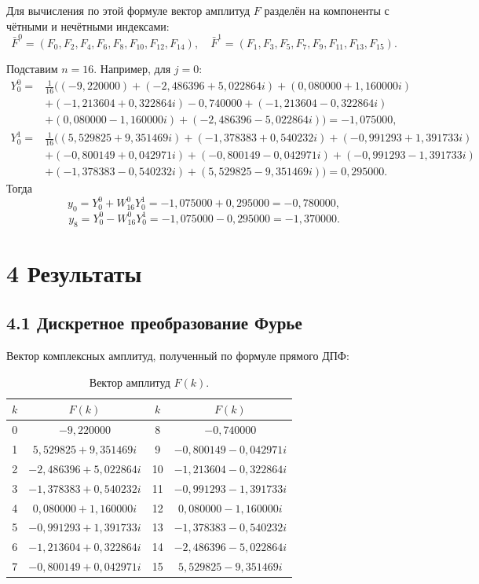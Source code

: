 \documentclass[14pt,a4paper]{extarticle}
\begin{document}
Для вычисления по этой формуле вектор амплитуд $F$ разделён на компоненты с чётными и нечётными индексами:
\begingroup\scriptsize
\[
\bar F^0=(F_0,F_2,F_4,F_6,F_8,F_{10},F_{12},F_{14}),
\quad
\bar F^1=(F_1,F_3,F_5,F_7,F_9,F_{11},F_{13},F_{15}).
\]
\endgroup

Подставим $n=16$. Например, для $j=0$:
\begingroup\scriptsize
\begin{align*}
Y^0_0={}&\frac{1}{16}\bigl((-9{,}220000)+(-2{,}486396+5{,}022864i)
+(0{,}080000+1{,}160000i)\\
&+(-1{,}213604+0{,}322864i)-0{,}740000
+(-1{,}213604-0{,}322864i)\\
&+(0{,}080000-1{,}160000i)+(-2{,}486396-5{,}022864i)\bigr)
=-1{,}075000,\\
Y^1_0={}&\frac{1}{16}\bigl((5{,}529825+9{,}351469i)
+(-1{,}378383+0{,}540232i)
+(-0{,}991293+1{,}391733i)\\
&+(-0{,}800149+0{,}042971i)
+(-0{,}800149-0{,}042971i)
+(-0{,}991293-1{,}391733i)\\
&+(-1{,}378383-0{,}540232i)
+(5{,}529825-9{,}351469i)\bigr)
=0{,}295000.
\end{align*}
\endgroup
Тогда
\[
y_0=Y^0_0+W_{16}^{0}Y^1_0=-1{,}075000+0{,}295000=-0{,}780000,
\]
\[
y_8=Y^0_0-W_{16}^{0}Y^1_0=-1{,}075000-0{,}295000=-1{,}370000.
\]

\newpage

\section*{4 Результаты}

\subsection*{4.1 Дискретное преобразование Фурье}
Вектор комплексных амплитуд, полученный по формуле прямого ДПФ:

\begin{table}[H]
\centering
\caption{Вектор амплитуд $F(k)$.}
\small
\begin{tabular}{|c|c||c|c|}
\hline
$k$ & $F(k)$ & $k$ & $F(k)$ \\ \hline
0 & $-9{,}220000$ & 8 & $-0{,}740000$ \\ \hline
1 & $5{,}529825+9{,}351469i$ & 9 & $-0{,}800149-0{,}042971i$ \\ \hline
2 & $-2{,}486396+5{,}022864i$ & 10 & $-1{,}213604-0{,}322864i$ \\ \hline
3 & $-1{,}378383+0{,}540232i$ & 11 & $-0{,}991293-1{,}391733i$ \\ \hline
4 & $0{,}080000+1{,}160000i$ & 12 & $0{,}080000-1{,}160000i$ \\ \hline
5 & $-0{,}991293+1{,}391733i$ & 13 & $-1{,}378383-0{,}540232i$ \\ \hline
6 & $-1{,}213604+0{,}322864i$ & 14 & $-2{,}486396-5{,}022864i$ \\ \hline
7 & $-0{,}800149+0{,}042971i$ & 15 & $5{,}529825-9{,}351469i$ \\ \hline
\end{tabular}
\end{table}
\end{document}
